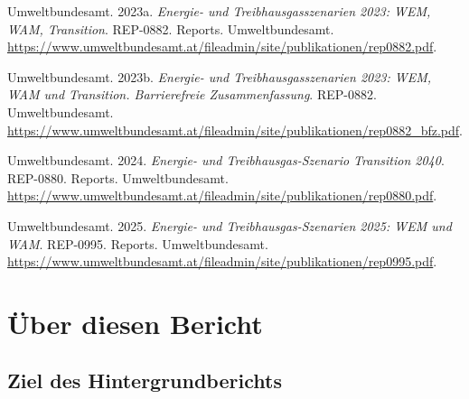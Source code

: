 \documentclass[
  ngerman,
  a4paper,
  DIV=11]{scrreprt}
\newlength{\cslhangindent}
\newenvironment{CSLReferences}[2] %
 {\begin{list}{}{%
  \setlength{\itemindent}{0pt}
  \setlength{\leftmargin}{0pt}
  \setlength{\parsep}{0pt}
  \ifodd #1
   \setlength{\leftmargin}{\cslhangindent}
   \setlength{\itemindent}{-1\cslhangindent}
  \fi
  \setlength{\itemsep}{#2\baselineskip}}}
 {\end{list}}
\begin{document}
\begin{CSLReferences}{1}{1}
Umweltbundesamt. 2023a. \emph{Energie- und Treibhausgasszenarien 2023:
WEM, WAM, Transition}. REP-0882. Reports. Umweltbundesamt.
\url{https://www.umweltbundesamt.at/fileadmin/site/publikationen/rep0882.pdf}.

Umweltbundesamt. 2023b. \emph{Energie- und Treibhausgasszenarien 2023:
WEM, WAM und Transition. Barrierefreie Zusammenfassung}. REP-0882.
Umweltbundesamt.
\url{https://www.umweltbundesamt.at/fileadmin/site/publikationen/rep0882_bfz.pdf}.

Umweltbundesamt. 2024. \emph{Energie- und Treibhausgas-Szenario
Transition 2040}. REP-0880. Reports. Umweltbundesamt.
\url{https://www.umweltbundesamt.at/fileadmin/site/publikationen/rep0880.pdf}.

Umweltbundesamt. 2025. \emph{Energie- und Treibhausgas-Szenarien 2025:
WEM und WAM}. REP-0995. Reports. Umweltbundesamt.
\url{https://www.umweltbundesamt.at/fileadmin/site/publikationen/rep0995.pdf}.

\end{CSLReferences}


\chapter*{Über diesen Bericht}\label{sec-about}


\begin{tcolorbox}[enhanced jigsaw, arc=.35mm, bottomrule=.15mm, bottomtitle=1mm, breakable, colback=white, colbacktitle=quarto-callout-note-color!10!white, colframe=quarto-callout-note-color-frame, coltitle=black, left=2mm, leftrule=.75mm, opacityback=0, opacitybacktitle=0.6, rightrule=.15mm, title=\textcolor{quarto-callout-note-color}{\faInfo}\hspace{0.5em}{Arbeitsfassung vom 14. Oktober 2026}, titlerule=0mm, toprule=.15mm, toptitle=1mm]

\end{tcolorbox}

\section*{Ziel des
Hintergrundberichts}\label{ziel-des-hintergrundberichts}
\end{document}
